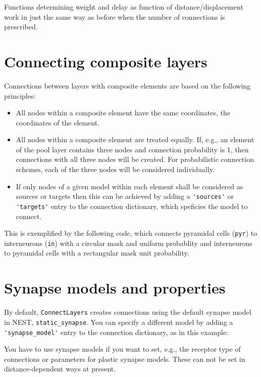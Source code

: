 \documentclass[a4paper,12pt]{report}
\begin{document}
Functions determining weight and delay as function of
distance/displacement work in just the same way as before when the
number of connections is prescribed.

\section{Connecting composite layers}\label{sec:conn_composite}

Connections between layers with composite elements are based on the
following principles:
\begin{itemize}
\item All nodes within a composite element have the same
  coordinates, the coordinates of the element.
\item All nodes within a composite element are treated equally. If,
  e.g., an element of the pool layer contains three nodes and
  connection probability is 1, then connections with all three nodes
  will be created. For probabilistic connection schemes, each of the
  three nodes will be considered individually.
\item If only nodes of a given model within each element
  shall be considered as sources or targets then this can be achieved
  by adding a \lstinline!'sources'! or \lstinline!'targets'! entry to
  the connection dictionary, which speficies the model to connect.
\end{itemize}
This is exemplified by the following code, which connects pyramidal
cells (\lstinline!pyr!) to interneurons (\lstinline!in!) with a
circular mask and uniform probablity and interneurons to pyramidal
cells with a rectangular mask unit probability.



\section{Synapse models and properties}\label{sec:conn_synapse}

By default, \lstinline!ConnectLayers! creates connections using the
default synapse model in NEST,
\lstinline!static_synapse!. You can specify a different model by
adding a \lstinline!'synapse_model'! entry to the connection
dictionary, as in this example:

You have to use synapse models if you want to set, e.g., the receptor
type of connections or parameters for plastic synapse models. These
can not be set in distance-dependent ways at present.
\end{document}
